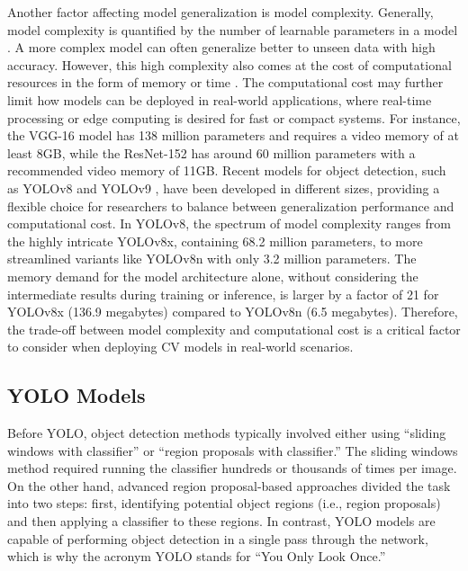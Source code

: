 Another factor affecting model generalization is model complexity. Generally, model complexity is quantified by the number of learnable parameters in a model \cite{hu2021model}. A more complex model can often generalize better to unseen data with high accuracy. However, this high complexity also comes at the cost of computational resources in the form of memory or time \cite{justus2018predicting}. The computational cost may further limit how models can be deployed in real-world applications, where real-time processing or edge computing is desired for fast or compact systems. For instance, the VGG-16 model \cite{simonyan2014very} has 138 million parameters and requires a video memory of at least 8GB, while the ResNet-152 \cite{he2016deep} has around 60 million parameters with a recommended video memory of 11GB. Recent models for object detection, such as YOLOv8 \cite{ultralyticsYOLOv8} and YOLOv9 \cite{wang2024yolov9}, have been developed in different sizes, providing a flexible choice for researchers to balance between generalization performance and computational cost. In YOLOv8, the spectrum of model complexity ranges from the highly intricate YOLOv8x, containing 68.2 million parameters, to more streamlined variants like YOLOv8n with only 3.2 million parameters. The memory demand for the model architecture alone, without considering the intermediate results during training or inference, is larger by a factor of 21 for YOLOv8x (136.9 megabytes) compared to YOLOv8n (6.5 megabytes). Therefore, the trade-off between model complexity and computational cost is a critical factor to consider when deploying CV models in real-world scenarios.

\subsection*{YOLO Models}

Before YOLO, object detection methods typically involved either using “sliding windows with classifier” or “region proposals with classifier.” The sliding windows method required running the classifier hundreds or thousands of times per image. On the other hand, advanced region proposal-based approaches divided the task into two steps: first, identifying potential object regions (i.e., region proposals) and then applying a classifier to these regions. In contrast, YOLO models are capable of performing object detection in a single pass through the network, which is why the acronym YOLO stands for “You Only Look Once.”

